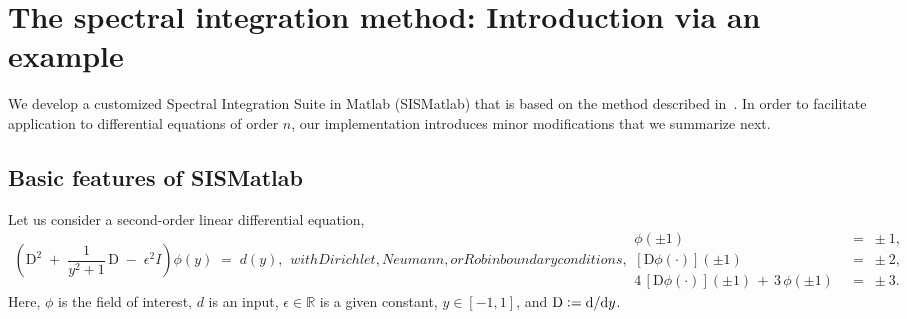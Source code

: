 \documentclass[%
secnumarabic,%
 amssymb, amsmath,%
 aps,prf,superscriptaddress,longbibliography
frontmatterverbose,
]{revtex4-2}
\newcommand{\DefinedAs}[0]{\mathrel{\mathop:}=}
\begin{document}
\maketitle

\newpage
\section{The spectral integration method: Introduction via an example}
	\label{sec:intro}
	\vspace*{-2ex}
	
We develop a customized Spectral Integration Suite in Matlab ({\sf SISMatlab}) that is based on the method described in~\cite{GreSIAM91,DuSIAM2016}. In order to facilitate application to differential equations of order $n$, our implementation introduces minor modifications that we summarize next. 

	\vspace*{-4ex}
	\subsection{Basic features of SISMatlab}
	
		\vspace*{-2ex}
Let us consider a second-order linear differential equation,
\begin{subequations}
  \begin{align}
    \left( 
 \mathrm  D^{2} \; + \; \dfrac{1}{y^2 + 1} \, \mathrm D \; - \; \epsilon^2 I 
 \right) 
 \phi (y) 
 \; = \; 
 d(y),\label{eq:1}
  \end{align}  
  with Dirichlet, Neumann, or Robin boundary conditions,
  \begin{align}
    \phi (\pm 1) \;& =\;  \pm 1, \label{eq:1Dir}
    \\
  [{\mathrm  D} \phi (\cdot)](\pm 1) \;& =\; \pm 2, \label{eq:1c}
    \\
   4\,[{\mathrm  D} \phi (\cdot)](\pm 1)  \,+\, 3\,\phi (\pm 1) \;&=\; \pm 3. \label{eq:1d}
  \end{align}
\end{subequations}
Here, $\phi$ is the field of interest, $d$ is an input, $\epsilon \in \mathbb{R}$ is a given constant, $y \in [-1, 1]$, and $\D \DefinedAs \mathrm d / \mathrm dy$.
\end{document}
